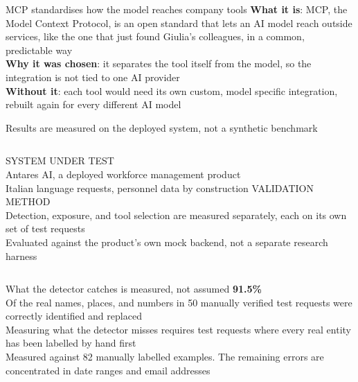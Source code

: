 \documentclass[aspectratio=169,11pt]{beamer}
\begin{document}
\begin{frame}{MCP standardises how the model reaches company tools}
  \small
  \vspace{2mm}
  \textbf{What it is}: MCP, the Model Context Protocol, is an open standard that lets an AI model reach outside services, like the one that just found Giulia's colleagues, in a common, predictable way\\[4mm]
  \textbf{Why it was chosen}: it separates the tool itself from the model, so the integration is not tied to one AI provider\\[4mm]
  \textbf{Without it}: each tool would need its own custom, model specific integration, rebuilt again for every different AI model
\end{frame}

\begin{frame}{Results are measured on the deployed system, not a synthetic benchmark}
  \small
  \begin{columns}[t]
      {\color{slidegray}\footnotesize SYSTEM UNDER TEST}\\[1mm]
      Antares AI, a deployed workforce management product\\[2mm]
      Italian language requests, personnel data by construction
      {\color{unitnred}\footnotesize VALIDATION METHOD}\\[1mm]
      Detection, exposure, and tool selection are measured separately, each on its own set of test requests\\[2mm]
      Evaluated against the product's own mock backend, not a separate research harness
  \end{columns}
\end{frame}

\begin{frame}{What the detector catches is measured, not assumed}
  \centering
  \vspace{4mm}
  {\Huge\bfseries\color{slideblue} 91.5\%}\\[2mm]
  {\small Of the real names, places, and numbers in 50 manually verified test requests were correctly identified and replaced}\\[3mm]
  {\small\color{slidegray} Measuring what the detector misses requires test requests where every real entity has been labelled by hand first}\\[3mm]
  {\footnotesize\color{slidegray} Measured against 82 manually labelled examples. The remaining errors are concentrated in date ranges and email addresses}
\end{frame}
\end{document}
